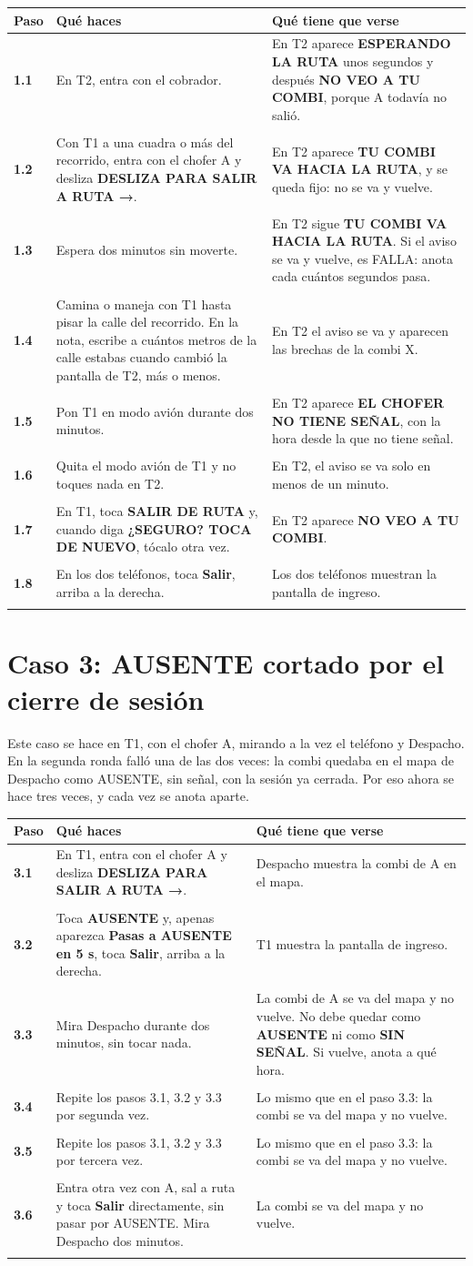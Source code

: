 \documentclass[10pt,a4paper]{article}
\makeatletter
\newcommand{\toca}[1]{\textcolor{azul}{\textbf{#1}}}
\newcommand{\pantalla}[1]{\textcolor{marron}{\textbf{#1}}}
\newcommand{\caja}[2]{\hbox{\vrule height #1 depth 0pt width 0pt #2}}
\newcommand{\campo}[3]{%
  \raisebox{-0.35\height}{\caja{#3}{\TextField[name=#1, width=#2, height=#3, charsize=8pt, bordercolor={0.55 0.6 0.68},
    backgroundcolor={0.965 0.976 0.992}, multiline=true]{}}}}
\newcommand{\resultado}[1]{%
  \caja{9pt}{\ChoiceMenu[radio, name=resultado-#1, width=9pt, height=9pt, radiosymbol=l,
    bordercolor={0.35 0.38 0.45}, default=]{}{OK=ok,FALLA=falla,NO SE PUDO=nopudo}}}
\newcommand{\paso}[4]{%
  \textbf{#1} & #3 & #4 \\*
  \multicolumn{3}{@{\hspace{6pt}}l@{}}{\rule{0pt}{15pt}\small
    \resultado{#2}\hspace{0.4em}Hora:~\campo{hora-#2}{1.7cm}{13pt}\hspace{1.2em}Nota:~\campo{nota-#2}{8.3cm}{22pt}}\\[3pt]
  \hline
}
\newenvironment{pasos}{%
  \begin{longtable}{@{\hspace{6pt}}>{\raggedright\arraybackslash}p{0.9cm}>{\raggedright\arraybackslash}p{7.9cm}>{\raggedright\arraybackslash}p{7.3cm}@{}}
  \rowcolor{cabecera}\textbf{Paso} & \textbf{Qué haces} & \textbf{Qué tiene que verse} \\ \hline
  \endhead
}{\end{longtable}\vspace{-0.6em}}
\makeatother
\begin{document}
\begin{Form}
\begin{pasos}
\paso{1.1}{1-1}{En T2, entra con el cobrador.}{En T2 aparece \pantalla{ESPERANDO LA RUTA} unos segundos y después \pantalla{NO VEO A TU COMBI}, porque A todavía no salió.}
\paso{1.2}{1-2}{Con T1 a una cuadra o más del recorrido, entra con el chofer A y desliza \toca{DESLIZA PARA SALIR A RUTA →}.}{En T2 aparece \pantalla{TU COMBI VA HACIA LA RUTA}, y se queda fijo: no se va y vuelve.}
\paso{1.3}{1-3}{Espera dos minutos sin moverte.}{En T2 sigue \pantalla{TU COMBI VA HACIA LA RUTA}. Si el aviso se va y vuelve, es FALLA: anota cada cuántos segundos pasa.}
\paso{1.4}{1-4}{Camina o maneja con T1 hasta pisar la calle del recorrido. En la nota, escribe a cuántos metros de la calle estabas cuando cambió la pantalla de T2, más o menos.}{En T2 el aviso se va y aparecen las brechas de la combi X.}
\paso{1.5}{1-5}{Pon T1 en modo avión durante dos minutos.}{En T2 aparece \pantalla{EL CHOFER NO TIENE SEÑAL}, con la hora desde la que no tiene señal.}
\paso{1.6}{1-6}{Quita el modo avión de T1 y no toques nada en T2.}{En T2, el aviso se va solo en menos de un minuto.}
\paso{1.7}{1-7}{En T1, toca \toca{SALIR DE RUTA} y, cuando diga \pantalla{¿SEGURO? TOCA DE NUEVO}, tócalo otra vez.}{En T2 aparece \pantalla{NO VEO A TU COMBI}.}
\paso{1.8}{1-8}{En los dos teléfonos, toca \toca{Salir}, arriba a la derecha.}{Los dos teléfonos muestran la pantalla de ingreso.}
\end{pasos}

\section{Caso 3: AUSENTE cortado por el cierre de sesión}

Este caso se hace en T1, con el chofer A, mirando a la vez el teléfono y Despacho. En la segunda ronda falló una de las dos veces: la combi quedaba en el mapa de Despacho como AUSENTE, sin señal, con la sesión ya cerrada. Por eso ahora se hace tres veces, y cada vez se anota aparte.

\begin{pasos}
\paso{3.1}{3-1}{En T1, entra con el chofer A y desliza \toca{DESLIZA PARA SALIR A RUTA →}.}{Despacho muestra la combi de A en el mapa.}
\paso{3.2}{3-2}{Toca \toca{AUSENTE} y, apenas aparezca \pantalla{Pasas a AUSENTE en 5 s}, toca \toca{Salir}, arriba a la derecha.}{T1 muestra la pantalla de ingreso.}
\paso{3.3}{3-3}{Mira Despacho durante dos minutos, sin tocar nada.}{La combi de A se va del mapa y no vuelve. No debe quedar como \pantalla{AUSENTE} ni como \pantalla{SIN SEÑAL}. Si vuelve, anota a qué hora.}
\paso{3.4}{3-4}{Repite los pasos 3.1, 3.2 y 3.3 por segunda vez.}{Lo mismo que en el paso 3.3: la combi se va del mapa y no vuelve.}
\paso{3.5}{3-5}{Repite los pasos 3.1, 3.2 y 3.3 por tercera vez.}{Lo mismo que en el paso 3.3: la combi se va del mapa y no vuelve.}
\paso{3.6}{3-6}{Entra otra vez con A, sal a ruta y toca \toca{Salir} directamente, sin pasar por AUSENTE. Mira Despacho dos minutos.}{La combi se va del mapa y no vuelve.}
\end{pasos}


\end{Form}
\end{document}
